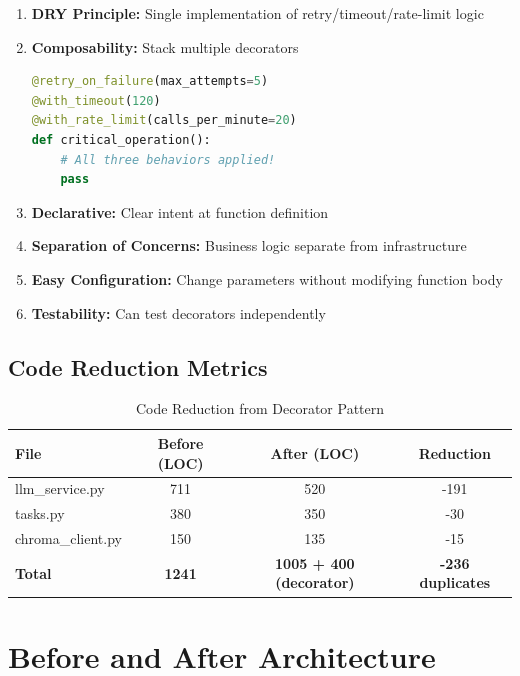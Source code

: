 \documentclass[11pt,a4paper]{article}
\begin{document}
\begin{enumerate}
    \item \textbf{DRY Principle:} Single implementation of retry/timeout/rate-limit logic

    \item \textbf{Composability:} Stack multiple decorators
    \begin{lstlisting}[language=Python]
@retry_on_failure(max_attempts=5)
@with_timeout(120)
@with_rate_limit(calls_per_minute=20)
def critical_operation():
    # All three behaviors applied!
    pass
    \end{lstlisting}

    \item \textbf{Declarative:} Clear intent at function definition

    \item \textbf{Separation of Concerns:} Business logic separate from infrastructure

    \item \textbf{Easy Configuration:} Change parameters without modifying function body

    \item \textbf{Testability:} Can test decorators independently
\end{enumerate}

\subsection{Code Reduction Metrics}

\begin{table}[H]
\centering
\begin{tabular}{|l|c|c|c|}
\hline
\textbf{File} & \textbf{Before (LOC)} & \textbf{After (LOC)} & \textbf{Reduction} \\
\hline
llm\_service.py & 711 & 520 & -191 \\
tasks.py & 380 & 350 & -30 \\
chroma\_client.py & 150 & 135 & -15 \\
\hline
\textbf{Total} & \textbf{1241} & \textbf{1005 + 400 (decorator)} & \textbf{-236 duplicates} \\
\hline
\end{tabular}
\caption{Code Reduction from Decorator Pattern}
\end{table}

\newpage

\section{Before and After Architecture}
\end{document}
